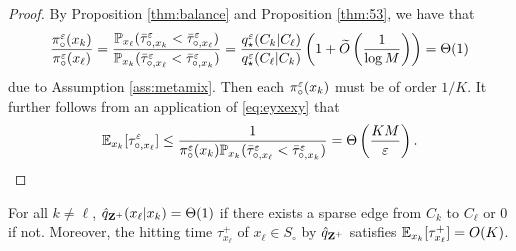 \begin{proof}
By Proposition \ref{thm:balance} and Proposition \ref{thm:53}, we have that
\begin{align*}
\frac{\pi_\circ^\varepsilon(x_k)}{\pi_\circ^\varepsilon(x_\ell)} = \frac{\mathbb{P}_{x_\ell}(\bar{\tau}_{\circ,x_k}^\varepsilon < \bar{\tau}_{\circ,x_\ell}^\varepsilon)}{\mathbb{P}_{x_k}(\bar{\tau}_{\circ,x_\ell}^\varepsilon < \bar{\tau}_{\circ,x_k}^\varepsilon)} = \frac{q_\star^\varepsilon(C_k|C_\ell)}{q_\star^\varepsilon(C_\ell|C_k)} \left( 1+\widetilde{O}\left(\frac{1}{\log M}\right)\right) = \Theta(1)
\end{align*}
due to Assumption \ref{ass:metamix}. Then each $\pi_\circ^\varepsilon(x_k)$ must be of order $1/K$. It further follows from an application of \eqref{eq:eyxexy} that
\begin{align*}
\mathbb{E}_{x_k}[\tau_{\circ,x_\ell}^\varepsilon] \le \frac{1}{\pi_\circ^\varepsilon(x_k)\mathbb{P}_{x_k}(\bar{\tau}_{\circ,x_\ell}^\varepsilon < \bar{\tau}_{\circ,x_k}^\varepsilon)} =\Theta\left(\frac{KM}{\varepsilon}\right).
\end{align*}
\end{proof}


\begin{thm}
For all $k\ne\ell$, $\hat{q}_{\mathbf{Z}^+}(x_\ell|x_k) = \Theta(1)$ if there exists a sparse edge from $C_k$ to $C_\ell$ or $0$ if not. Moreover, the hitting time $\tau_{x_\ell}^+$ of $x_\ell\in S_\circ$ by $\hat{q}_{\mathbf{Z}^+}$ satisfies $\mathbb{E}_{x_k}[\tau_{x_\ell}^+] = O(K)$.
\end{thm}

